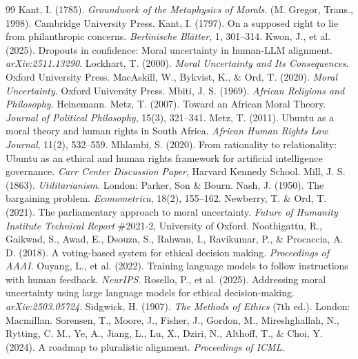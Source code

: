 \documentclass[10pt,twocolumn,a4paper]{article}
\begin{document}
\begin{thebibliography}{99}
 Kant, I. (1785). \textit{Groundwork of the Metaphysics of Morals}. (M. Gregor, Trans., 1998). Cambridge University Press.
 Kant, I. (1797). On a supposed right to lie from philanthropic concerns. \textit{Berlinische Bl\"{a}tter}, 1, 301--314.
 Kwon, J., et al. (2025). Dropouts in confidence: Moral uncertainty in human-LLM alignment. \textit{arXiv:2511.13290}.
 Lockhart, T. (2000). \textit{Moral Uncertainty and Its Consequences}. Oxford University Press.
 MacAskill, W., Bykvist, K., \& Ord, T. (2020). \textit{Moral Uncertainty}. Oxford University Press.
 Mbiti, J. S. (1969). \textit{African Religions and Philosophy}. Heinemann.
 Metz, T. (2007). Toward an African Moral Theory. \textit{Journal of Political Philosophy}, 15(3), 321--341.
 Metz, T. (2011). Ubuntu as a moral theory and human rights in South Africa. \textit{African Human Rights Law Journal}, 11(2), 532--559.
 Mhlambi, S. (2020). From rationality to relationality: Ubuntu as an ethical and human rights framework for artificial intelligence governance. \textit{Carr Center Discussion Paper}, Harvard Kennedy School.
 Mill, J. S. (1863). \textit{Utilitarianism}. London: Parker, Son \& Bourn.
 Nash, J. (1950). The bargaining problem. \textit{Econometrica}, 18(2), 155--162.
 Newberry, T. \& Ord, T. (2021). The parliamentary approach to moral uncertainty. \textit{Future of Humanity Institute Technical Report} \#2021-2, University of Oxford.
 Noothigattu, R., Gaikwad, S., Awad, E., Dsouza, S., Rahwan, I., Ravikumar, P., \& Procaccia, A. D. (2018). A voting-based system for ethical decision making. \textit{Proceedings of AAAI}.
 Ouyang, L., et al. (2022). Training language models to follow instructions with human feedback. \textit{NeurIPS}.
 Rosello, P., et al. (2025). Addressing moral uncertainty using large language models for ethical decision-making. \textit{arXiv:2503.05724}.
 Sidgwick, H. (1907). \textit{The Methods of Ethics} (7th ed.). London: Macmillan.
 Sorensen, T., Moore, J., Fisher, J., Gordon, M., Mireshghallah, N., Rytting, C. M., Ye, A., Jiang, L., Lu, X., Dziri, N., Althoff, T., \& Choi, Y. (2024). A roadmap to pluralistic alignment. \textit{Proceedings of ICML}.

\end{thebibliography}
\end{document}
